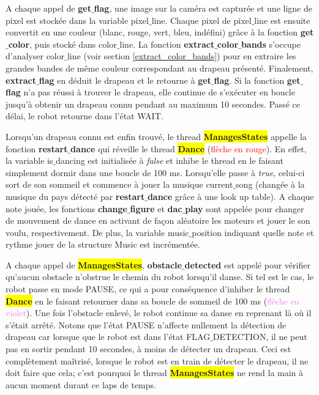 \documentclass{article}
\begin{document}
    A chaque appel de \textbf{get$\_$flag}, une image sur la caméra est capturée et une ligne de pixel est stockée dans la variable \textcolor{bleu}{pixel$\_$line}. 
    Chaque pixel de \textcolor{bleu}{pixel$\_$line} est ensuite convertit en une couleur (blanc, rouge, vert, bleu, indéfini) grâce à la fonction \textbf{get$\_$color}, puis stocké dans \textcolor{bleu}{color$\_$line}. 
    La fonction \textbf{extract$\_$color$\_$bands} s'occupe d'analyser \textcolor{bleu}{color$\_$line} (voir section \ref{extract_color_bands}) pour en extraire les grandes bandes de même couleur correspondant au drapeau présenté. 
    Finalement, \textbf{extract$\_$flag} en déduit le drapeau et le retourne à \textbf{get$\_$flag}. 
    Si la fonction \textbf{get$\_$flag} n'a pas réussi à trouver le drapeau, elle continue de s'exécuter en boucle jusqu'à obtenir un drapeau connu pendant au maximum 10 secondes. 
    Passé ce délai, le robot retourne dans l'état \textcolor{bleu}{WAIT}. \\ \par
    
    Lorsqu'un drapeau connu est enfin trouvé, le thread \colorbox{yellow}{\textbf{ManagesStates}} appelle la fonction \textbf{restart$\_$dance} qui réveille le thread \colorbox{yellow}{\textbf{Dance}} (\textcolor{red}{flèche en rouge}). 
    En effet, la variable \textcolor{bleu}{is$\_$dancing} est initialisée à \textit{false} et inhibe le thread en le faisant simplement dormir dans une boucle de 100 ms. 
    Lorsqu'elle passe à \textit{true}, celui-ci sort de son sommeil et commence à jouer la musique \textcolor{bleu}{current$\_$song} (changée à la musique du pays détecté par \textbf{restart$\_$dance} grâce à une look up table). 
    A chaque note jouée, les fonctions \textbf{change$\_$figure} et \textbf{dac$\_$play} sont appelée pour changer de mouvement de dance en activant de façon aléatoire les moteurs et jouer le son voulu, respectivement. 
    De plus, la variable \textcolor{bleu}{music$\_$position} indiquant quelle note et rythme jouer de la structure \textcolor{bleu}{Music} est incrémentée. \\ \par
    
    A chaque appel de \colorbox{yellow}{\textbf{ManagesStates}}, \textbf{obstacle$\_$detected} est appelé pour vérifier qu'aucun obstacle n'obstrue le chemin du robot lorsqu'il danse. 
    Si tel est le cas, le robot passe en mode \textcolor{bleu}{PAUSE}, ce qui a pour conséquence d'inhiber le thread \colorbox{yellow}{\textbf{Dance}} en le faisant retourner dans sa boucle de sommeil de 100 ms (\textcolor{violet}{flèche en violet}). 
    Une fois l'obstacle enlevé, le robot continue sa danse en reprenant là où il s'était arrêté. Notons que l'état \textcolor{bleu}{PAUSE} n'affecte nullement la détection de drapeau car lorsque que le robot est dans l'état \textcolor{bleu}{FLAG$\_$DETECTION}, il ne peut pas en sortir pendant 10 secondes, à moins de détecter un drapeau.
    Ceci est complètement maîtrisé, lorsque le robot est en train de détecter le drapeau, il ne doit faire que cela; c'est pourquoi le thread \colorbox{yellow}{\textbf{ManagesStates}} ne rend la main à aucun moment durant ce laps de temps.
\end{document}
